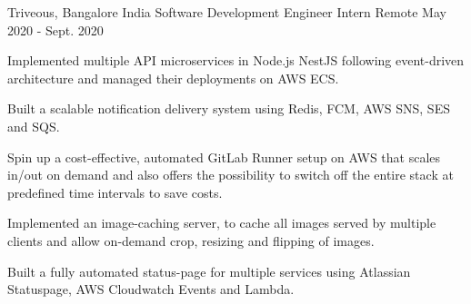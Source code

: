 

\begin{cventries}

  \cventry
    {Triveous, Bangalore India} %
    {Software Development Engineer Intern} %
    {Remote} %
    {May 2020 - Sept. 2020} %
    {
      \begin{cvitems} %
        \item {Implemented multiple API microservices in Node.js NestJS following event-driven architecture and managed their deployments on AWS ECS.}
        \item {Built a scalable notification delivery system using Redis, FCM, AWS SNS, SES and SQS.}
        \item {Spin up a cost-effective, automated GitLab Runner setup on AWS that scales in/out on demand and also offers the possibility to switch off the entire stack at predefined time intervals to save costs.}
        \item {Implemented an image-caching server, to cache all images served by multiple clients and allow on-demand crop, resizing and flipping of images.}
        \item {Built a fully automated status-page for multiple services using Atlassian Statuspage, AWS Cloudwatch Events and Lambda.}
      \end{cvitems}
    }


\end{cventries}
